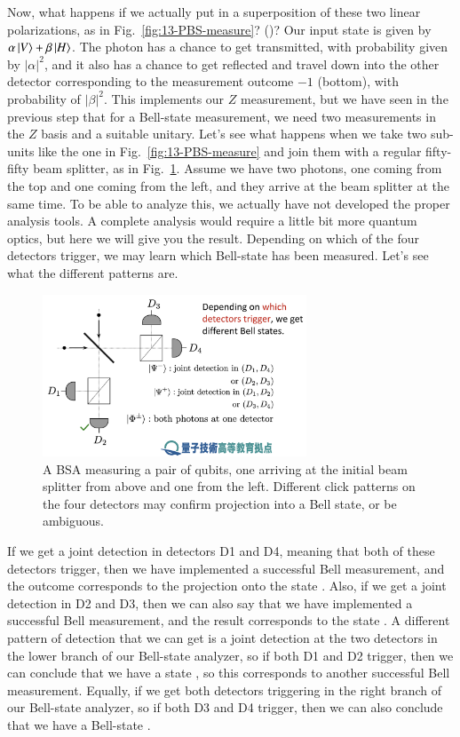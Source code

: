 Now, what happens if we actually put in a superposition of these two linear polarizations, as in Fig.~\ref{fig:13-PBS-measure}? ()? Our input state is given by $\alpha\left| V \right\rangle + \beta \left| H \right\rangle$. The photon has a chance to get transmitted, with probability given by $|\alpha|^2$, and it also has a chance to get reflected and travel down into the other detector corresponding to the measurement outcome $-1$ (bottom), with probability of $|\beta|^2$. This implements our $Z$ measurement, but we have seen in the previous step that for a Bell-state measurement, we need two measurements in the $Z$ basis and a suitable unitary. Let's see what happens when we take two sub-units like the one in Fig.~\ref{fig:13-PBS-measure} and join them with a regular fifty-fifty beam splitter, as in Fig.~\ref{fig:13-BSA-clicks}. Assume we have two photons, one coming from the top and one coming from the left, and they arrive at the beam splitter at the same time. To be able to analyze this, we actually have not developed the proper analysis tools.  A complete analysis would require a little bit more quantum optics, but here we will give you the result. Depending on which of the four detectors trigger, we may learn which Bell-state has been measured. Let's see what the different patterns are.

\begin{figure}[t]
    \centering
    \includegraphics[width=0.7\textwidth]{lesson13/BSA-clicks.png}
    \caption[A four-detector Bell-state analyzer (BSA)]{A BSA measuring a pair of qubits, one arriving at the initial beam splitter from above and one from the left.  Different click patterns on the four detectors may confirm projection into a Bell state, or be ambiguous.}
    \label{fig:13-BSA-clicks}
\end{figure}

If we get a joint detection in detectors D1 and D4, meaning that both of these detectors trigger, then we have implemented a successful Bell measurement, and the outcome corresponds to the projection onto the state \ket{\Psi^-}. Also, if we get a joint detection in D2 and D3, then we can also say that we have implemented a successful Bell measurement, and the result corresponds to the state \ket{\Psi^-}. A different pattern of detection that we can get is a joint detection at the two detectors in the lower branch of our Bell-state analyzer, so if both D1 and D2 trigger, then we can conclude that we have a state \ket{\Psi^+}, so this corresponds to another successful Bell measurement. Equally, if we get both detectors triggering in the right branch of our Bell-state analyzer, so if both D3 and D4 trigger, then we can also conclude that we have a Bell-state \ket{\Psi^+}.

